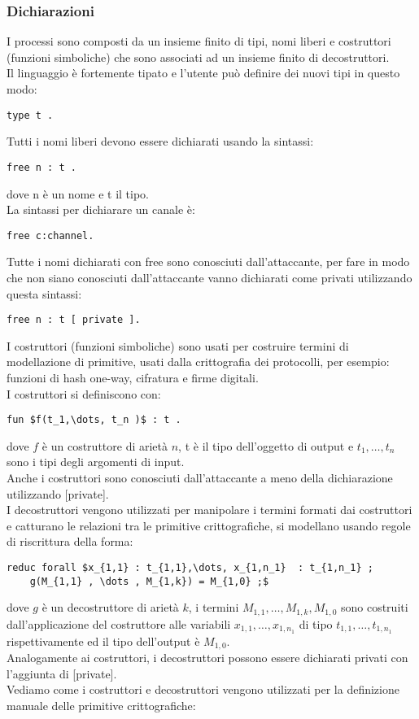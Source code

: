 \subsubsection*{Dichiarazioni}
I processi sono composti da un insieme finito di tipi, nomi liberi e costruttori (funzioni simboliche) che
sono associati ad un insieme finito di decostruttori.\\ 
Il linguaggio è fortemente tipato e l'utente può definire dei nuovi tipi in questo modo: 
\begin{lstlisting}[language=app]
    type t . 
\end{lstlisting}
Tutti i nomi liberi devono essere dichiarati usando la sintassi: 
\begin{lstlisting}[language=app]
    free n : t .
\end{lstlisting} 
dove n è un nome e t il tipo.\\
La sintassi per dichiarare un canale è: 
\begin{lstlisting}[language=app]
    free c:channel.   
\end{lstlisting}
Tutte i nomi dichiarati con free sono conosciuti dall'attaccante, per fare in modo che non siano conosciuti dall'attaccante vanno dichiarati come privati utilizzando questa sintassi: 
\begin{lstlisting}[language=app]
    free n : t [ private ]. 
\end{lstlisting}
I costruttori (funzioni simboliche) sono usati per costruire termini di modellazione di primitive, usati dalla crittografia dei
protocolli, per esempio: funzioni di hash one-way, cifratura e firme digitali.\\
I costruttori si definiscono con:
\begin{lstlisting}[language=app, mathescape]
    fun $f(t_1,\dots, t_n )$ : t . 
\end{lstlisting} 
dove $f$ è un costruttore di arietà $n$, t è il tipo dell'oggetto di output e $t_1,\dots, t_n $ sono i tipi degli argomenti di input.\\
Anche i costruttori sono conosciuti dall'attaccante a meno della dichiarazione utilizzando [private].\\
I decostruttori vengono utilizzati per manipolare i termini formati dai costruttori e catturano le relazioni tra le primitive crittografiche, si modellano usando regole di riscrittura della forma:
\begin{lstlisting}[language=app, mathescape, breaklines= true]
    reduc forall $x_{1,1} : t_{1,1},\dots, x_{1,n_1}  : t_{1,n_1} ; 
    g(M_{1,1} , \dots , M_{1,k}) = M_{1,0} ;$
\end{lstlisting} 
dove $g$ è un decostruttore di arietà $k$, i termini $M_{1,1} , \dots , M_{1,k}, M_{1,0}$ sono costruiti dall'applicazione del costruttore alle variabili $x_{1,1},\dots, x_{1,n_1}$ di tipo $t_{1,1},\dots,t_{1,n_1}$ rispettivamente ed il tipo dell'output è $M_{1,0}$.\\
Analogamente ai costruttori, i decostruttori possono essere dichiarati privati con l'aggiunta di [private].\\
Vediamo come i costruttori e decostruttori vengono utilizzati per la definizione manuale delle primitive crittografiche:


